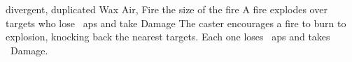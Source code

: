   {divergent, duplicated}%
  {Wax}%
  {Air, Fire}%
  {the size of the fire}%
  {A fire explodes over  targets who lose ~\glspl{ap} and take  Damage}%
  {
    The caster encourages a fire to burn to explosion, knocking back the nearest  targets.
    Each one loses ~\glspl{ap} and takes ~Damage.
  }
